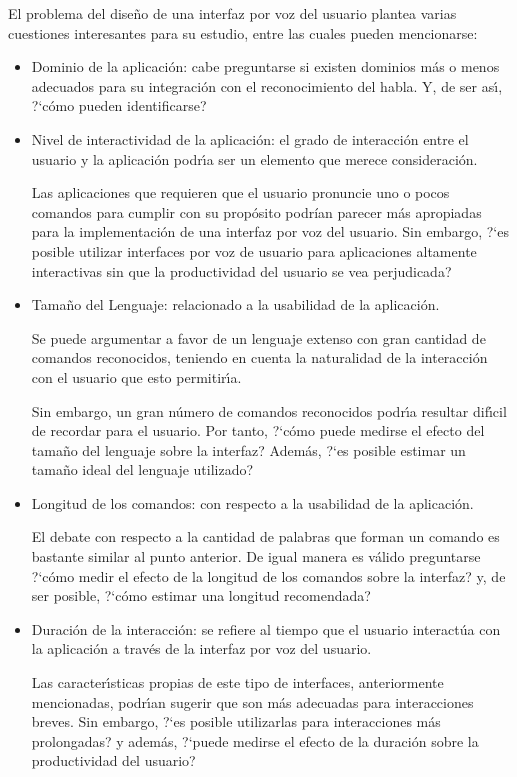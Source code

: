 El problema del dise\~no de una interfaz por voz del usuario plantea varias cuestiones interesantes para
su estudio, entre las cuales pueden mencionarse:

\begin{itemize}
	\item Dominio de la aplicaci\'on: cabe preguntarse si existen dominios m\'as o menos adecuados para su
	integraci\'on con el reconocimiento del habla. Y, de ser as{\'\i}, {?`}c\'omo pueden identificarse?
	\item Nivel de interactividad de la aplicaci\'on: el grado de interacci\'on entre el usuario y
	la aplicaci\'on podr{\'\i}a ser un elemento que merece consideraci\'on.
	
	Las aplicaciones que requieren que el usuario pronuncie uno o pocos comandos para cumplir con su
prop\'osito podr\'ian parecer m\'as apropiadas para la implementaci\'on de una interfaz por voz del usuario.
	Sin embargo, {?`}es posible utilizar interfaces por voz de usuario para aplicaciones altamente
	interactivas sin que la productividad del usuario se vea perjudicada?

	\item Tama\~no del Lenguaje: relacionado a la usabilidad de la aplicaci\'on.

	Se puede argumentar a favor de un lenguaje extenso con gran cantidad de comandos reconocidos, 
	teniendo en cuenta la naturalidad de la interacci\'on con el usuario que esto permitir{\'\i}a.

	Sin embargo, un gran n\'umero de comandos reconocidos podr{\'\i}a resultar dif{\'\i}cil de recordar para
	el usuario. Por tanto, {?`}c\'omo puede medirse el efecto del tama\~no del lenguaje sobre la interfaz? 
	Adem\'as, {?`}es posible estimar un tama\~no ideal del lenguaje utilizado?

	\item Longitud de los comandos: con respecto a la usabilidad de la aplicaci\'on.

	El debate con respecto a la cantidad de palabras que forman un comando es bastante similar
	al punto anterior. De igual manera es v\'alido preguntarse {?`}c\'omo medir el efecto de la longitud
	de los comandos sobre la interfaz? y, de ser posible, {?`}c\'omo estimar una longitud recomendada?

	\item Duraci\'on de la interacci\'on: se refiere al tiempo que el usuario interact\'ua con la aplicaci\'on
	a trav\'es de la interfaz por voz del usuario.

	Las caracter{\'\i}sticas propias de este tipo de interfaces, anteriormente mencionadas, podr{\'\i}an sugerir
	que son m\'as adecuadas para interacciones breves. Sin embargo, {?`}es posible utilizarlas para 
	interacciones m\'as prolongadas? y adem\'as, {?`}puede medirse el efecto de la duraci\'on sobre la productividad
	del usuario? 

\end{itemize}


